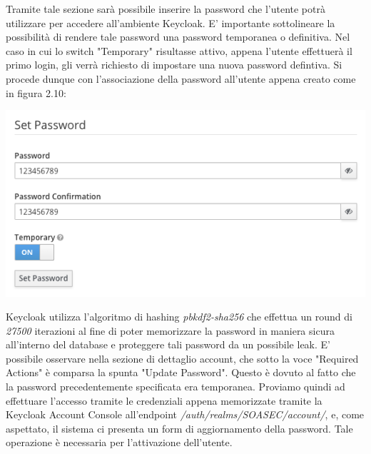\documentclass[twoside]{report}
\begin{document}
Tramite tale sezione sarà possibile inserire la password che l'utente potrà utilizzare per accedere all'ambiente Keycloak.
\bigbreak
E' importante sottolineare la possibilità di rendere tale password una password temporanea o definitiva. Nel caso in cui lo switch "Temporary" risultasse attivo, appena l'utente effettuerà il primo login, gli verrà richiesto di impostare una nuova password defintiva.
\bigbreak
Si procede dunque con l'associazione della password all'utente appena creato come in figura 2.10:

\begin{center}
\begin{minipage}{\linewidth}
    \vspace{2mm}
    \centering
    \includegraphics[width= \linewidth]{10.png}
    \vspace{2mm}
\end{minipage}
\end{center}

Keycloak utilizza l'algoritmo di hashing \textit{pbkdf2-sha256} che effettua un round di \textit{27500} iterazioni al fine di poter memorizzare la password in maniera sicura all'interno del database e proteggere tali password da un possibile leak.
\bigbreak
E' possibile osservare nella sezione di dettaglio account, che sotto la voce "Required Actions" è comparsa la spunta "Update Password". Questo è dovuto al fatto che la password precedentemente specificata era temporanea.
\bigbreak
Proviamo quindi ad effettuare l'accesso tramite le credenziali appena memorizzate tramite la Keycloak Account Console all'endpoint \textit{/auth/realms/SOASEC/account/}, e, come aspettato, il sistema ci presenta un form di aggiornamento della password. Tale operazione è necessaria per l'attivazione dell'utente.
\end{document}
